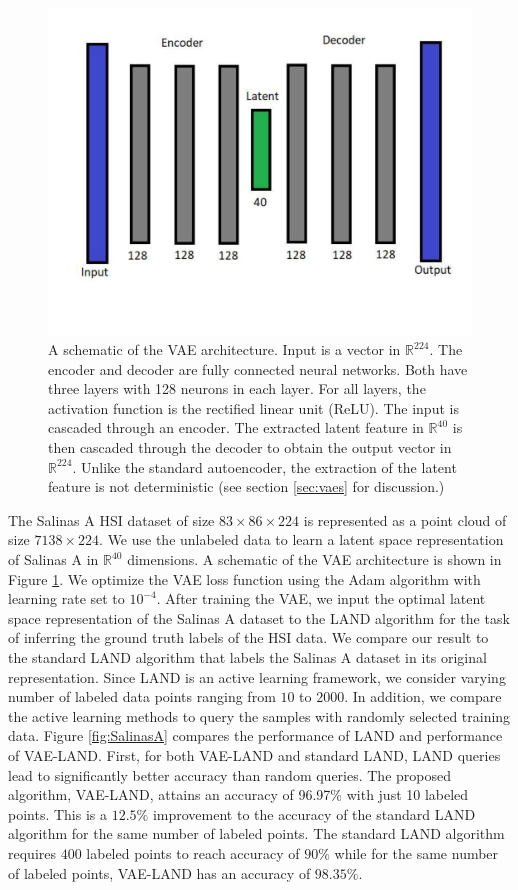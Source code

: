 \documentclass{article}
\def\R{\mathbb{R}}
\def\R{{\mathbb R}}
\begin{document}
\begin{figure}[h]
\includegraphics[clip,width=.45\textwidth,trim=1cm 3.5cm 1cm 1cm]{Images/VAE_Schematics.pdf}
\caption{\small{A schematic of the VAE architecture.  Input is a vector in $\R^{224}$. The encoder and decoder are fully connected neural networks. Both have three layers with 128 neurons in each layer. For all layers, the activation function is the rectified linear unit (ReLU).
The input is cascaded through an encoder. The extracted latent feature in $\R^{40}$ is then cascaded through the decoder to obtain the
output vector in $\R^{224}$.  Unlike the standard autoencoder, the extraction of the latent feature is not deterministic (see section \ref{sec:vaes} for discussion.)}}
\label{fig:vae_schematics}
\end{figure}
The Salinas A HSI dataset of size $83 \times 86\times 224$ is represented as a point cloud of size $7138\times 224$. We use the unlabeled data to learn a latent space representation of Salinas A in $\R^{40}$ dimensions. A schematic of the VAE architecture is shown in Figure \ref{fig:vae_schematics}. We optimize the VAE loss function using the Adam algorithm with learning rate set to $10^{-4}$. After training the VAE, we input the optimal latent space representation of the Salinas A dataset to the LAND algorithm for the task of inferring the ground truth labels of the HSI data. We compare our result to the standard LAND algorithm that labels the Salinas A dataset in its original representation. Since LAND is an active learning framework, we consider varying number of labeled data points ranging from $10$ to $2000$. In addition, we compare the active learning methods to query the samples with randomly selected training data. Figure \ref{fig:SalinasA} compares the performance of LAND and performance of VAE-LAND. First, for both VAE-LAND and standard LAND, LAND queries lead to significantly better accuracy than random queries. The proposed algorithm, VAE-LAND, attains an accuracy of 96.97\% with just 10 labeled points. This is a $12.5\%$ improvement to the accuracy of the standard LAND algorithm for the same number of labeled points. The standard LAND algorithm requires $400$ labeled points to reach accuracy of $90\%$ while for the same number of labeled points, VAE-LAND has an accuracy of $98.35\%$. 
\end{document}

